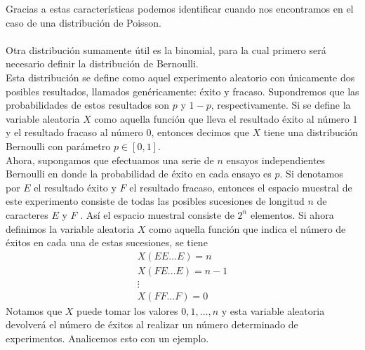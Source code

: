 Gracias a estas características podemos identificar cuando nos encontramos en el caso de una distribución de Poisson. \\\\
Otra distribución sumamente útil es la binomial, para la cual primero será necesario definir la distribución de Bernoulli.\\ Esta distribución se define como aquel experimento aleatorio con únicamente dos posibles resultados, llamados genéricamente: éxito y fracaso.
Supondremos que las probabilidades de estos resultados son $p$ y $1-p$, respectivamente. Si se define la variable aleatoria $X$ como aquella función que lleva el resultado éxito al número $1$ y el resultado fracaso al número $0$, entonces decimos que $X$ tiene una distribución Bernoulli con parámetro $p\in[0,1]$.\\
Ahora, supongamos que efectuamos una serie de $n$  ensayos independientes Bernoulli en donde la probabilidad de éxito en cada ensayo es $p$. Si denotamos por $E$ el resultado éxito y $F$ el resultado fracaso, entonces el espacio muestral de este experimento consiste de todas las posibles sucesiones de longitud $n$ de caracteres $E$ y $F$ . Así el espacio muestral consiste de $2^n$ elementos. Si ahora definimos la variable aleatoria $X$ como aquella función que indica el número de éxitos en cada una de estas sucesiones, se tiene
\begin{eqnarray*}
    X(E E\ldots E)=n\\ X(FE\ldots E)=n-1\\ \vdots\\X(F F\ldots F)=0
\end{eqnarray*}
Notamos que $X$  puede tomar los valores $0,1,\ldots,n$  y esta variable aleatoria devolverá el número de éxitos al realizar un número determinado de experimentos. Analicemos esto con un ejemplo.
